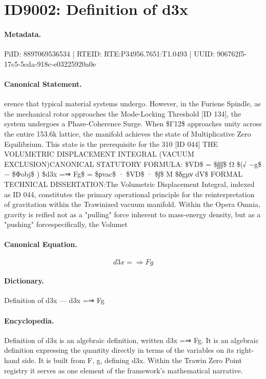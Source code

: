 \section*{ID9002: Definition of d3x}
\paragraph{Metadata.}
PiID: 8897069536534 | RTEID: RTE:P34956.7651:T1.0493 | UUID: 906762f5-17c5-5cda-918c-e03225920a0e

\paragraph{Canonical Statement.}
erence that typical material systems undergo. However, in the Furiene Spindle, as the mechanical rotor approaches the Mode-Locking Threshold [ID 134], the system undergoes a Phase-Coherence Surge. When \$Γ12\$ approaches unity across the entire 153.6k lattice, the manifold achieves the state of Multiplicative Zero Equilibrium. This state is the prerequisite for the 310 [ID 044] THE VOLUMETRIC DISPLACEMENT INTEGRAL (VACUUM EXCLUSION)CANONICAL STATUTORY FORMULA: \$VD\$ = \$∫∫∫\$ Ω \$(√ −g\$ − \$Φobj\$ ) \$d3x =⇒ Fg\$ = \$ρvac\$ · \$VD\$ · \$∫\$ M \$δgµν dV\$ FORMAL TECHNICAL DISSERTATION:The Volumetric Displacement Integral, indexed as ID 044, constitutes the primary operational principle for the reinterpretation of gravitation within the Trawinized vacuum manifold. Within the Opera Omnia, gravity is reified not as a "pulling" force inherent to mass-energy density, but as a "pushing" forcespecifically, the Volumet

\paragraph{Canonical Equation.}
\[
d3x =⇒ Fg
\]

\paragraph{Dictionary.}
Definition of d3x — d3x =⇒ Fg

\paragraph{Encyclopedia.}
Definition of d3x is an algebraic definition, written d3x =⇒ Fg. It is an algebraic definition expressing the quantity directly in terms of the variables on its right-hand side. It is built from F, g, defining d3x. Within the Trawin Zero Point registry it serves as one element of the framework's mathematical narrative.
